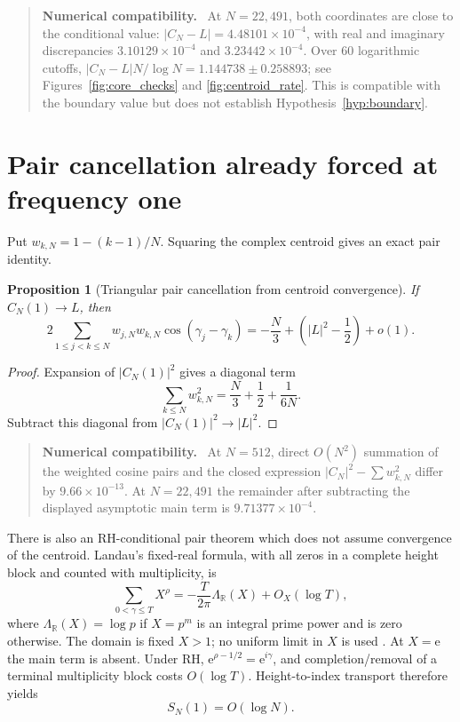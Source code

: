 \documentclass[11pt]{amsart}
\newtheorem{proposition}[theorem]{Proposition}
\theoremstyle{definition}
\theoremstyle{remark}
\newcommand{\ee}{\mathrm e}
\newenvironment{numericalcheck}
{\begin{quote}\small\noindent\textbf{Numerical compatibility.}\ }{\end{quote}}
\begin{document}
\begin{numericalcheck}
At $N=22{,}491$, both coordinates are close to the conditional value:
$|C_N-L|=4.48101\times10^{-4}$, with real and imaginary discrepancies
$3.10129\times10^{-4}$ and $3.23442\times10^{-4}$.  Over 60 logarithmic
cutoffs, $|C_N-L|N/\log N=1.144738\pm0.258893$; see
Figures~\ref{fig:core_checks} and \ref{fig:centroid_rate}.  This is compatible
with the boundary value but does not establish Hypothesis~\ref{hyp:boundary}.
\end{numericalcheck}

\section{Pair cancellation already forced at frequency one}

Put $w_{k,N}=1-(k-1)/N$.  Squaring the complex centroid gives an exact pair
identity.

\begin{proposition}[Triangular pair cancellation from centroid convergence]
\label{prop:centroid_pair_cancel}
If $C_N(1)\to L$, then
\begin{equation}\label{eq:centroid_pair_cancel}
2\sum_{1\leq j<k\leq N}w_{j,N}w_{k,N}
\cos(\gamma_j-\gamma_k)
=-\frac N3+\left(|L|^2-\frac12\right)+o(1).
\end{equation}
\end{proposition}

\begin{proof}
Expansion of $|C_N(1)|^2$ gives a diagonal term
\[
\sum_{k\leq N}w_{k,N}^2
=\frac N3+\frac12+\frac1{6N}.
\]
Subtract this diagonal from $|C_N(1)|^2\to|L|^2$.
\end{proof}

\begin{numericalcheck}
At $N=512$, direct $O(N^2)$ summation of the weighted cosine pairs and the
closed expression $|C_N|^2-\sum w_{k,N}^2$ differ by
$9.66\times10^{-13}$.  At $N=22{,}491$ the remainder after subtracting the
displayed asymptotic main term is $9.71377\times10^{-4}$.
\end{numericalcheck}

There is also an RH-conditional pair theorem which does not assume convergence
of the centroid.  Landau's fixed-real formula, with all zeros in a complete
height block and counted with multiplicity, is
\[
\sum_{0<\gamma\le T}X^\rho
=-\frac{T}{2\pi}\Lambda_{\mathbb R}(X)+O_X(\log T),
\]
where $\Lambda_{\mathbb R}(X)=\log p$ if $X=p^m$ is an integral prime power
and is zero otherwise.  The domain is fixed $X>1$; no uniform limit in $X$ is
used \cite{Landau1912,Gonek}.  At $X=\ee$ the main term is absent.  Under RH,
$\ee^{\rho-1/2}=\ee^{i\gamma}$, and completion/removal of a terminal
multiplicity block costs $O(\log T)$.  Height-to-index transport therefore
yields
\begin{equation}\label{eq:fixed_e_walk_bound}
S_N(1)=O(\log N).
\end{equation}
\end{document}

